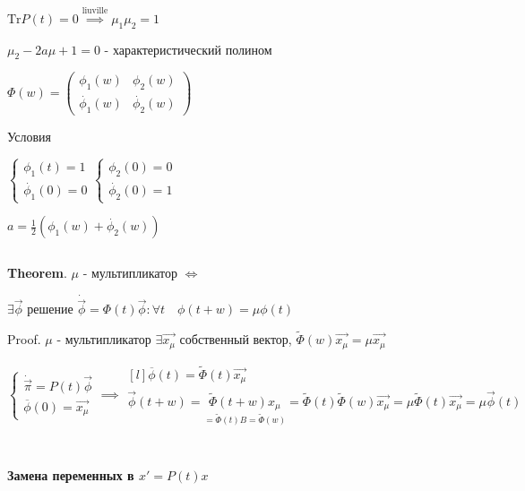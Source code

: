 \documentclass[12pt, a4paper]{article}
\begin{document}
    $\text{Tr}P(t) = 0 \overset{\text{liuville}}{\implies} \mu_1 \mu_2 = 1$

    $\mu_2 - 2a\mu + 1 = 0$ - характеристический полином

    $\Phi(w) = \begin{pmatrix}
        \phi_1(w) & \phi_2(w) \\ \dot{\phi_1}(w) & \dot{\phi_2}(w)
    \end{pmatrix}$

    Условия 

    $\begin{cases}
        \phi_1(t) = 1 \\ \dot{\phi_1}(0) = 0 
    \end{cases}
    \begin{cases}
        \phi_2(0) = 0 \\ \dot{\phi_2}(0) = 1
    \end{cases}$

    $a = \frac{1}{2}(\phi_1(w) + \dot{\phi_2}(w))$

    \par $ $

    \textbf{Theorem}. $\mu$ - мультипликатор $\iff$

    $\exists \vec{\phi}$ решение $\dot{\vec{\phi}} = \Phi(t)\vec{\phi} :
    \forall t \quad \phi(t+w) = \mu\phi(t)$

    Proof. $\mu$ - мультипликатор $\exists \vec{x_\mu}$ собственный вектор,
    $\widetilde{\Phi}(w)\vec{x_\mu} = \mu\vec{x_\mu}$

    $\begin{cases}
        \dot{\vec{\pi}} = P(t)\vec{\phi} \\ 
        \overline{\phi}(0) = \vec{x_\mu}
    \end{cases} \implies 
    \begin{matrix*}[l]
        \overline{\phi}(t) = \widetilde{\Phi}(t)\vec{x_\mu} \\ 
        \vec{\phi}(t+w) = \underset{=\widetilde{\Phi}(t)B = \widetilde{\Phi}(w)}{\widetilde{\Phi}(t+w)x_\mu} = \widetilde{\Phi}(t)\boxed{\widetilde{\Phi}(w)\vec{x_\mu}}
        = \mu\widetilde{\Phi}(t)\vec{x_\mu} = \mu \vec{\phi}(t)
    \end{matrix*}$

    \par $ $
    
    \par $ $

    \textbf{Замена переменных в $x' = P(t)x$}
\end{document}
